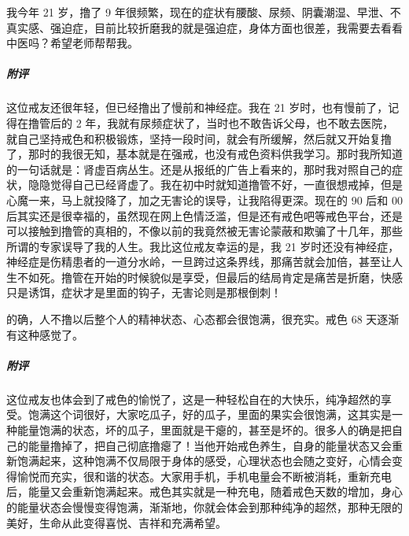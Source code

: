 \begin{case}
    我今年 21 岁，撸了 9 年很频繁，现在的症状有腰酸、尿频、阴囊潮湿、早泄、不真实感、强迫症，目前比较折磨我的就是强迫症，身体方面也很差，我需要去看看中医吗？希望老师帮帮我。
    \subparagraph{附评} 这位戒友还很年轻，但已经撸出了慢前和神经症。我在 21 岁时，也有慢前了，记得在撸管后的 2 年，我就有尿频症状了，当时也不敢告诉父母，也不敢去医院，就自己坚持戒色和积极锻炼，坚持一段时间，就会有所缓解，然后就又开始复撸了，那时的我很无知，基本就是在强戒，也没有戒色资料供我学习。那时我所知道的一句话就是：肾虚百病丛生。还是从报纸的广告上看来的，那时我对照自己的症状，隐隐觉得自己已经肾虚了。我在初中时就知道撸管不好，一直很想戒掉，但是心魔一来，马上就投降了，加之无害论的误导，让我陷得更深。现在的 90 后和 00 后其实还是很幸福的，虽然现在网上色情泛滥，但是还有戒色吧等戒色平台，还是可以接触到撸管的真相的，不像以前的我竟然被无害论蒙蔽和欺骗了十几年，那些所谓的专家误导了我的人生。我比这位戒友幸运的是，我 21 岁时还没有神经症，神经症是伤精患者的一道分水岭，一旦跨过这条界线，那痛苦就会加倍，甚至让人生不如死。撸管在开始的时候貌似是享受，但最后的结局肯定是痛苦是折磨，快感只是诱饵，症状才是里面的钩子，无害论则是那根倒刺！
\end{case}

\begin{case}
    的确，人不撸以后整个人的精神状态、心态都会很饱满，很充实。戒色 68 天逐渐有这种感觉了。
    \subparagraph{附评} 这位戒友也体会到了戒色的愉悦了，这是一种轻松自在的大快乐，纯净超然的享受。饱满这个词很好，大家吃瓜子，好的瓜子，里面的果实会很饱满，这其实是一种能量饱满的状态，坏的瓜子，里面就是干瘪的，甚至是坏的。很多人的确是把自己的能量撸掉了，把自己彻底撸瘪了！当他开始戒色养生，自身的能量状态又会重新饱满起来，这种饱满不仅局限于身体的感受，心理状态也会随之变好，心情会变得愉悦而充实，很和谐的状态。大家用手机，手机电量会不断被消耗，重新充电后，能量又会重新饱满起来。戒色其实就是一种充电，随着戒色天数的增加，身心的能量状态会慢慢变得饱满，渐渐地，你就会体会到那种纯净的超然，那种无限的美好，生命从此变得喜悦、吉祥和充满希望。
\end{case}

